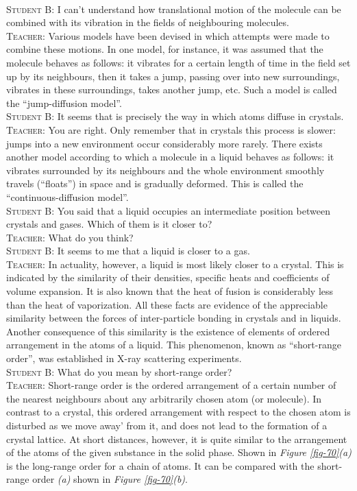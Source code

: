 \documentclass[a4paper,sfsidenotes]{tufte-book}
\begin{document}
\\
\textsc{Student B:} I can't understand how translational motion of the molecule can be combined with its vibration in the fields of neighbouring molecules.
\\
\textsc{Teacher:} Various models have been devised in which attempts were made to combine these motions. In one model, for instance, it was assumed that the molecule behaves as follows: it vibrates for a certain length of time in the field set up by its neighbours, then it takes a jump, passing over into new surroundings, vibrates in these surroundings, takes another jump, etc. Such a model is called the ``jump-diffusion model''.
\\
\textsc{Student B:} It seems that is precisely the way in which atoms diffuse in crystals.
\\
\textsc{Teacher:} You are right. Only remember that in crystals this process is slower: jumps into a new environment occur considerably more rarely. There exists another model according to which a molecule in a liquid behaves as follows: it vibrates surrounded by its neighbours and the whole environment smoothly travels (``floats'') in space and is gradually deformed. This is called the ``continuous-diffusion model''.
\\
\textsc{Student B:} You said that a liquid occupies an intermediate position between crystals and gases. Which of them is it closer to?
\\
\textsc{Teacher:} What do you think?
\\
\textsc{Student B:} It seems to me that a liquid is closer to a gas.
\\
\textsc{Teacher:} In actuality, however, a liquid is most likely closer to a crystal. This is indicated by the similarity of their densities, specific heats and coefficients of volume expansion. It is also known that the heat of fusion is considerably less than the heat of vaporization. All these facts are evidence of the appreciable similarity between the forces of inter-particle bonding in crystals and in liquids. Another consequence of this similarity is the existence of elements of ordered arrangement in the atoms of a liquid. This phenomenon, known as ``short-range order'', was established in X-ray scattering experiments.
\\
\textsc{Student B:} What do you mean by short-range order?
\\
\textsc{Teacher:} Short-range order is the ordered arrangement of a certain number of the nearest neighbours about any arbitrarily chosen atom (or molecule). In contrast to a crystal, this ordered arrangement with respect to the chosen atom is disturbed as we move away' from it, and does not lead to the formation of a crystal lattice. At short distances, however, it is quite similar to the arrangement of the atoms of the given substance in the solid phase. Shown in \emph{Figure \ref{fig-70}(a)} is the long-range order for a chain of atoms. It can be compared with the short-range order
\emph{(a)} shown in \emph{Figure \ref{fig-70}(b)}.
\end{document}
